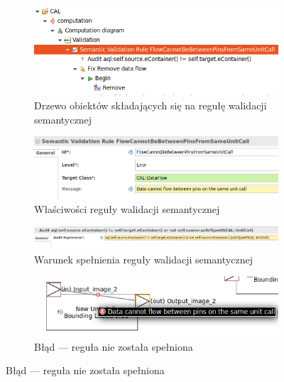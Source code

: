 \begin{figure}[!ht]
	\centering
	\begin{subfigure}{.8\textwidth}
		\centering
		\includegraphics[width=.99\linewidth]{./images/sirius-desktop-example-semantic-validation-rule-tree.png}
		\caption{Drzewo obiektów składających się na regułę walidacji
      semantycznej}\label{rys:sirius-desktop-example-semantic-validation-rule-tree}
	\end{subfigure}

  \medskip

	\begin{subfigure}{.92\textwidth}
		\centering
		\includegraphics[width=.99\linewidth]{./images/sirius-desktop-example-semantic-validation-rule-properties.png}
		\caption{Właściwości reguły walidacji semantycznej}\label{rys:sirius-desktop-example-semantic-validation-rule-properties}
	\end{subfigure}

  \medskip

	\begin{subfigure}{.92\textwidth}
		\centering
		\includegraphics[width=.99\linewidth]{./images/sirius-desktop-example-semantic-validation-rule-audit.png}
		\caption{Warunek spełnienia reguły walidacji semantycznej}\label{rys:sirius-desktop-example-semantic-validation-rule-audit}
	\end{subfigure}

  \begin{subfigure}{.92\textwidth}
    \centering
    \includegraphics[width=.99\linewidth]{./images/sirius-desktop-example-semantic-validation-rule-failure.png}
    \caption{Błąd --- reguła nie została
    spełniona}\label{rys:sirius-desktop-example-semantic-validation-rule-failure}
  \end{subfigure}


\end{figure}
